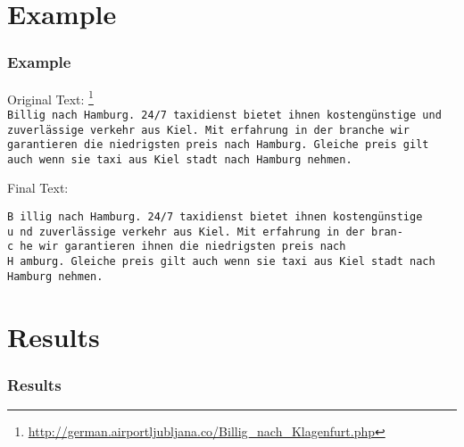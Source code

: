 \documentclass{beamer}
\begin{document}
\section{Example}
\begin{frame}

\frametitle{Example}
Original Text: \footnote{\tiny \url{http://german.airportljubljana.co/Billig\_nach\_Klagenfurt.php}} \\
\texttt{\scriptsize Billig nach Hamburg. 24/7 taxidienst bietet ihnen kostengünstige und \\
zuverlässige verkehr aus Kiel. Mit erfahrung in der branche wir \\
garantieren die niedrigsten preis nach Hamburg. Gleiche preis gilt \\
auch wenn sie taxi aus Kiel stadt nach Hamburg nehmen. \\}

Final Text: \par

\texttt{\footnotesize{B} \scriptsize illig nach Hamburg. 24/7 taxidienst bietet ihnen kostengünstige \\
\footnotesize{u} \scriptsize nd zuverlässige verkehr aus Kiel. Mit erfahrung in der bran- \\
\footnotesize{c} \scriptsize he wir garantieren ihnen die niedrigsten preis nach \\
\footnotesize{H} \scriptsize amburg. Gleiche preis gilt auch wenn sie taxi aus Kiel stadt nach \\
Hamburg nehmen. \\}
\end{frame}


\section{Results}
\begin{frame}
\frametitle{Results}
\end{frame}

\end{document}
